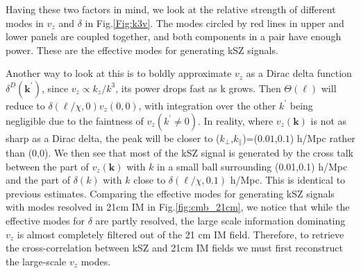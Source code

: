 Having these two factors in mind, 
we look at the relative strength of 
different modes in $v_z$ and $\delta$ in Fig.\ref{Fig:k3v}. 
The modes circled by red lines in upper and lower panels are coupled together, 
and both components in a pair have enough power. 
These are the effective modes for generating kSZ signals. 

Another way to look at this is to 
boldly approximate $v_z$ as a Dirac delta function $\delta^D(\bm{k}^\prime)$,  
since $v_z \propto k_z/k^3$, its power drops fast as k grows.  
Then $\Theta(\bm{\ell})$ will reduce to $\delta(\bm{\ell}/\chi,0) v_z(0,0)$, with integration over the other $k^\prime$ being negligible due to the faintness of $v_z(k^\prime\neq0)$. In reality, where $v_z(\bm{k})$ is not as sharp as a Dirac delta, the peak will be closer to ($k_\perp$,$k_\parallel$)=($0.01$,$0.1$) h/Mpc rather than (0,0). We then see  
that most of the kSZ signal is generated by the cross talk between the part of $v_z(\bm{k})$ with $k$ in a small ball surrounding (0.01,0.1) h/Mpc and the part of $\delta(k)$ with $k$ close to $\delta(\bm{\ell}/\chi,0.1)$ h/Mpc. 
This is identical to previous estimates. 
Comparing the effective modes for generating kSZ signals with 
modes resolved in 21cm IM in Fig.\ref{fig:cmb_21cm}, 
we notice that while the effective modes for $\delta$ are partly resolved, the large scale information dominating $v_z$ is almost completely filtered out of the 21 cm IM field. Therefore, to retrieve the cross-correlation between kSZ and 21cm IM fields we must first reconstruct the large-scale $v_z$ modes.
